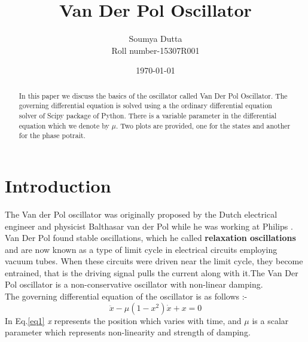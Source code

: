 \documentclass{article}
\begin{document}
\title{Van Der Pol Oscillator}
\author{Soumya Dutta\\
Roll number-15307R001}
\date{\today}
\maketitle
\clearpage
\tableofcontents
\clearpage
\begin{abstract}
    In this paper we discuss the basics of the oscillator called Van Der Pol Oscillator. The governing differential equation is solved using a
    the ordinary differential equation solver of Scipy package of Python. There is a variable parameter in the differential equation which we
    denote by $\mu$. Two plots are provided, one for the states and another for the phase potrait.
\end{abstract}
\section{Introduction}
The Van der Pol oscillator was originally proposed by the Dutch electrical engineer and physicist Balthasar van der Pol while he was working at Philips \cite{van}. Van Der Pol found stable oscillations, which he called \textbf{relaxation oscillations} and are now known as a type of limit cycle in electrical circuits employing vacuum tubes. When these circuits were driven near the limit cycle, they become entrained, that is the driving signal pulls the current along with it.The Van Der Pol oscillator is a non-conservative oscillator with non-linear damping. \\
The governing differential equation of the oscillator is as follows :-
\begin{equation}\label{eq1}
    \ddot{x}-\mu (1-x^{2}) \dot{x} + x=0
\end{equation}
In Eq.\ref{eq1} \textit{x} represents the position which varies with time, and $\mu$ is a scalar parameter which represents non-linearity and 
strength of damping.
\end{document}
